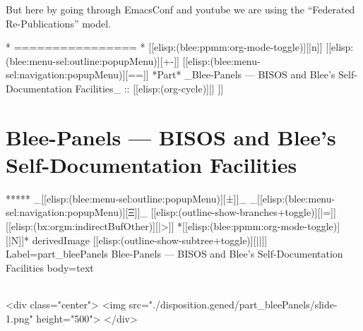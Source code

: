 \begin{whenOrg}
\begin{verblatex}
\begin{frame}[fragile,plain,label=bisosPlatformProgression]
{  But here by going through EmacsConf and youtube we are using the
  ``Federated Re-Publications'' model.

}
\end{frame}
\end{verblatex}



\begin{whenOrg}
*      ================
*  [[elisp:(blee:ppmm:org-mode-toggle)][|n]] [[elisp:(blee:menu-sel:outline:popupMenu)][+-]] [[elisp:(blee:menu-sel:navigation:popupMenu)][==]]  *Part*   _Blee-Panels --- BISOS and Blee's Self-Documentation Facilities_ ::  [[elisp:(org-cycle)][| ]]
\end{whenOrg}

\newpage
\part{Blee-Panels --- BISOS and Blee's Self-Documentation Facilities}

\begin{whenOrg}
*****  _[[elisp:(blee:menu-sel:outline:popupMenu)][±]]_ _[[elisp:(blee:menu-sel:navigation:popupMenu)][Ξ]]_ [[elisp:(outline-show-branches+toggle)][|=]] [[elisp:(bx:orgm:indirectBufOther)][|>]] *[[elisp:(blee:ppmm:org-mode-toggle)][|N]]*  derivedImage [[elisp:(outline-show-subtree+toggle)][||]] Label=part_bleePanels Blee-Panels --- BISOS and Blee's Self-Documentation Facilities body=text
\end{whenOrg}

\begin{htmlonly}

\begin{frame}[fragile,plain,label=part_bleePanels]
    \frametitle{}
    \framesubtitle{}
    \begin{rawhtml}
<div class="center">
<img src="./disposition.gened/part_bleePanels/slide-1.png" height="500">
</div>
    \end{rawhtml}
\end{frame}
\end{htmlonly}


\end{whenOrg}

